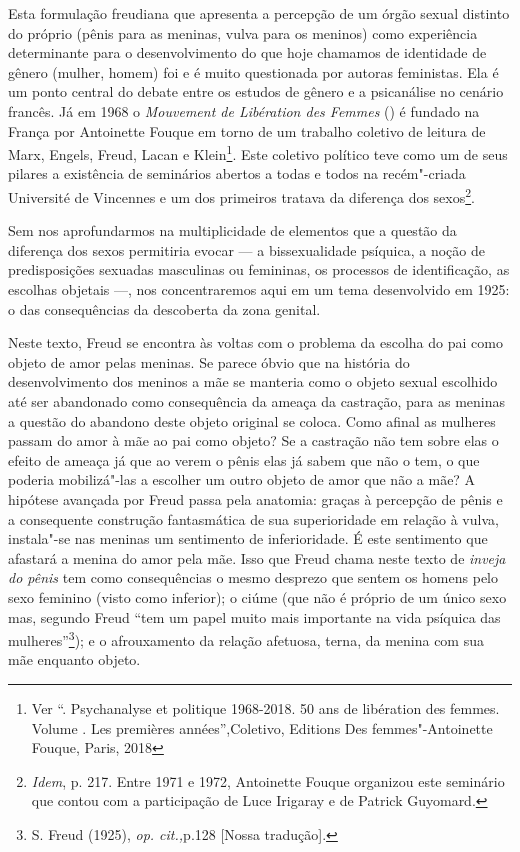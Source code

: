 Esta formulação freudiana que apresenta a percepção de um órgão sexual
distinto do próprio (pênis para as meninas, vulva para os meninos) como
experiência determinante para o desenvolvimento do que hoje chamamos de
identidade de gênero (mulher, homem) foi e é muito questionada por
autoras feministas. Ela é um ponto central do debate entre os estudos de
gênero e a psicanálise no cenário francês. Já em 1968 o \emph{Mouvement
de Libération des Femmes} () é fundado na França por Antoinette
Fouque em torno de um trabalho coletivo de leitura de Marx, Engels,
Freud, Lacan e Klein\footnote{Ver ``. Psychanalyse et politique
  1968-2018. 50 ans de libération des femmes. Volume . Les premières
  années'',Coletivo, Editions Des femmes"-Antoinette Fouque, Paris, 2018}.
Este coletivo político teve como um de seus pilares a existência de
seminários abertos a todas e todos na recém"-criada Université de
Vincennes e um dos primeiros tratava da diferença dos sexos\footnote{\emph{Idem},
  p. 217. Entre 1971 e 1972, Antoinette Fouque organizou este seminário
  que contou com a participação de Luce Irigaray e de Patrick Guyomard.}.

Sem nos aprofundarmos na multiplicidade de elementos que a questão da
diferença dos sexos permitiria evocar --- a bissexualidade psíquica, a
noção de predisposições sexuadas masculinas ou femininas, os processos
de identificação, as escolhas objetais ---, nos concentraremos aqui em um
tema desenvolvido em 1925: o das consequências da descoberta da zona
genital.

Neste texto, Freud se encontra às voltas com o problema da escolha do
pai como objeto de amor pelas meninas. Se parece óbvio que na história
do desenvolvimento dos meninos a mãe se manteria como o objeto sexual
escolhido até ser abandonado como consequência da ameaça da castração,
para as meninas a questão do abandono deste objeto original se coloca.
Como afinal as mulheres passam do amor à mãe ao pai como objeto? Se a
castração não tem sobre elas o efeito de ameaça já que ao verem o pênis
elas já sabem que não o tem, o que poderia mobilizá"-las a escolher um
outro objeto de amor que não a mãe? A hipótese avançada por Freud passa
pela anatomia: graças à percepção de pênis e a consequente construção
fantasmática de sua superioridade em relação à vulva, instala"-se nas
meninas um sentimento de inferioridade. É este sentimento que afastará a
menina do amor pela mãe. Isso que Freud chama neste texto de
\emph{inveja do pênis} tem como consequências o mesmo desprezo que
sentem os homens pelo sexo feminino (visto como inferior); o ciúme (que
não é próprio de um único sexo mas, segundo Freud ``tem um papel muito
mais importante na vida psíquica das mulheres''\footnote{S. Freud
  (1925), \emph{op. cit.,}p.128 {[}Nossa tradução{]}.}); e o
afrouxamento da relação afetuosa, terna, da menina com sua mãe enquanto
objeto.

